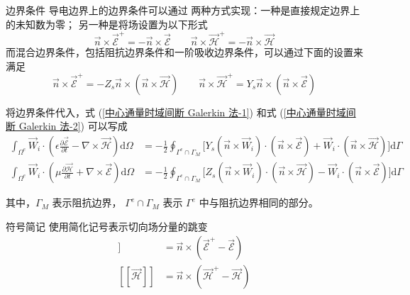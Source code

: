 \begin{definition}{边界条件}
    导电边界上的边界条件可以通过
    两种方式实现：一种是直接规定边界上的未知数为零；
    另一种是将场设置为以下形式
    \begin{equation}
        \vec{n}\times\vec{\mathscr{E}}^+=
        -\vec{n}\times\vec{\mathscr{E}}
        \qquad
        \vec{n}\times\vec{\mathscr{H}}^+=
        -\vec{n}\times\vec{\mathscr{H}}
    \end{equation}
    而混合边界条件，包括阻抗边界条件和一阶吸收边界条件，可以通过下面的设置来满足
    \begin{equation}
        \vec{n}\times\vec{\mathscr{E}}^+=
        -Z_s\vec{n}\times
        (\vec{n}\times\vec{\mathscr{H}})
        \qquad
        \vec{n}\times\vec{\mathscr{H}}^+=
        Y_s\vec{n}\times
        (\vec{n}\times\vec{\mathscr{E}})
    \end{equation}
\end{definition}

\par 将边界条件代入，式 (\ref{中心通量时域间断 Galerkin 法-1}) 和式 (\ref{中心通量时域间断 Galerkin 法-2})
可以写成
\begin{align}
    \int_{\Omega^e}\vec{W}_i\cdot\left(
        \epsilon\frac{\partial\vec{\mathscr{E}}}{\partial t}
        -\nabla\times\vec{\mathscr{H}}
    \right)\text{d}\Omega
    &=-\frac{1}{2}\oint_{\Gamma^e\cap\Gamma_M}
    \Big[
        Y_s(\vec{n}\times\vec{W}_i)\cdot
        (\vec{n}\times\vec{\mathscr{E}})
        +\vec{W}_i\cdot
        (\vec{n}\times\vec{\mathscr{H}})
    \Big]\text{d}\Gamma\\
    \int_{\Omega^e}\vec{W}_i\cdot\left(
        \mu\frac{\partial\vec{\mathscr{H}}}{\partial t}
        +\nabla\times\vec{\mathscr{E}}
    \right)\text{d}\Omega
    &=-\frac{1}{2}\oint_{\Gamma^e\cap\Gamma_M}
    \Big[
        Z_s(\vec{n}\times\vec{W}_i)\cdot
        (\vec{n}\times\vec{\mathscr{H}})
        -\vec{W}_i\cdot
        (\vec{n}\times\vec{\mathscr{E}})
    \Big]\text{d}\Gamma
\end{align}
\par 其中，$\Gamma_M$ 表示阻抗边界，
$\Gamma^e\cap\Gamma_M$ 表示 $\Gamma^e$ 中与阻抗边界相同的部分。

\begin{definition}{符号简记}
    使用简化记号表示切向场分量的跳变
    \begin{align}
        [\![\vec{\mathscr{E}}]\!]
        &=\vec{n}\times(\vec{\mathscr{E}}^+-\vec{\mathscr{E}})\\
        [\![\vec{\mathscr{H}}]\!]
        &=\vec{n}\times(\vec{\mathscr{H}}^+-\vec{\mathscr{H}})
    \end{align}
\end{definition}

